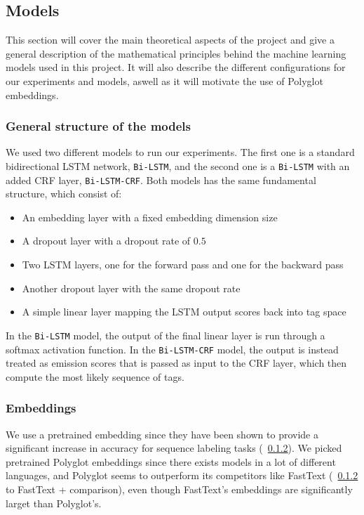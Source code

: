 
\subsection{Models}

This section will cover the main theoretical aspects of the project and give a
general description of the mathematical principles behind the machine learning
models used in this project. It will also describe the different configurations
for our experiments and models, aswell as it will motivate the use of Polyglot
embeddings.


\subsubsection{General structure of the models}

We used two different models to run our experiments. The first one is a standard
bidirectional LSTM network, \texttt{Bi-LSTM}, and the second one is a
\texttt{Bi-LSTM} with an added CRF layer, \texttt{Bi-LSTM-CRF}. Both models has
the same fundamental structure, which consist of:

\begin{itemize}
    \item An embedding layer with a fixed embedding dimension size
    \item A dropout layer with a dropout rate of $0.5$
    \item Two LSTM layers, one for the forward pass and one for the backward
        pass
    \item Another dropout layer with the same dropout rate
    \item A simple linear layer mapping the LSTM output scores back into tag
        space
\end{itemize}

In the \texttt{Bi-LSTM} model, the output of the final linear layer is run
through a softmax activation function. In the \texttt{Bi-LSTM-CRF} model, the
output is instead treated as emission scores that is passed as input to the CRF
layer, which then compute the most likely sequence of tags.



\subsubsection{Embeddings}

We use a pretrained embedding since they have been shown to provide a
significant increase in accuracy for sequence labeling tasks (~\ref{}).
We picked pretrained Polyglot embeddings since there exists models in a lot of
different languages, and Polyglot seems to outperform its competitors like
FastText (~\ref{} to FastText + comparison), even though FastText's embeddings are
significantly larget than Polyglot's.



